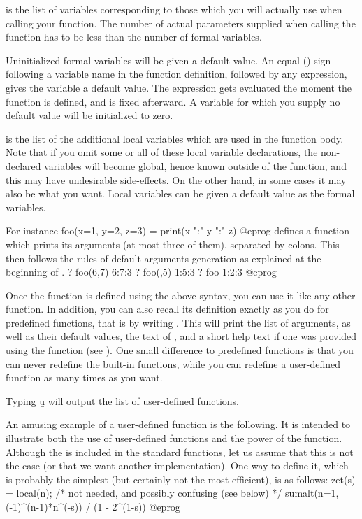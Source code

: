  is the list of variables corresponding to
those which you will actually use when calling your function. The number of
actual parameters supplied when calling the function has to be less than the
number of formal variables.

Uninitialized formal variables will be given a default value. An equal
(\kbd{=}) sign following a variable name in the function definition,
followed by any expression, gives the variable a default value. The
expression gets evaluated the moment the function is defined, and is fixed
afterward. A variable for which you supply no default value will be
initialized to zero.

 is the list of the additional local variables
which are used in the function body. Note that if you omit some or all of
these local variable declarations, the non-declared variables will become
global, hence known outside of the function, and this may have undesirable
side-effects. On the other hand, in some cases it may also be what you want.
Local variables can be given a default value as the formal variables.

 For instance
\bprog
  foo(x=1, y=2, z=3) = print(x ":" y ":" z)
@eprog
\noindent defines a function which prints its arguments (at most three of
them), separated by colons. This then follows the rules of default
arguments generation as explained at the beginning of
.
\bprog
? foo(6,7)
6:7:3
? foo(,5)
1:5:3
? foo
1:2:3
@eprog

  Once the function is defined using the above syntax, you can use it like
any other function. In addition, you can also recall its definition exactly
as you do for predefined functions, that is by writing .
This will print the list of arguments, as well as their default values,
the text of , and a short help text if one was provided using
the  function (see ). One small difference
to predefined functions is that you can never redefine the built-in
functions, while you can redefine a user-defined function as many times
as you want.

Typing \b{u} will output the list of user-defined functions.

An amusing example of a user-defined function is the following. It is
intended to illustrate both the use of user-defined functions and the power
of the  function. Although the  is
included in the standard functions, let us assume that this is not the case
(or that we want another implementation). One way to define it, which is
probably the simplest (but certainly not the most efficient), is as
follows:
\bprog
zet(s) =
{
  local(n); /* not needed, and possibly confusing (see below) */
  sumalt(n=1, (-1)^(n-1)*n^(-s)) / (1 - 2^(1-s))
}
@eprog

